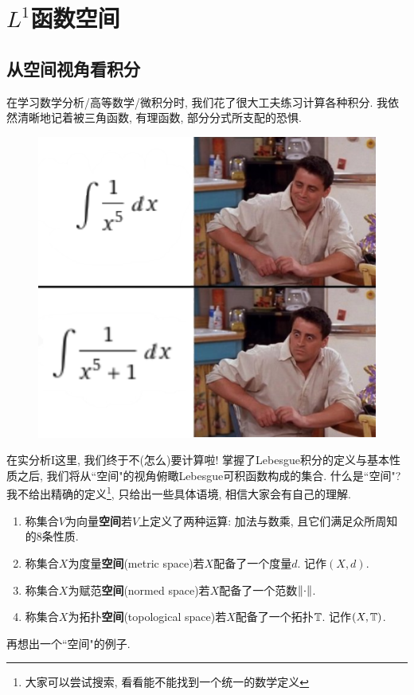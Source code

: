 \section{$L^1$函数空间}\label{L1_space}
\subsection{从空间视角看积分}
在学习数学分析/高等数学/微积分时, 我们花了很大工夫练习计算各种积分. 我依然清晰地记着被三角函数, 有理函数, 部分分式所支配的恐惧. 
\begin{figure}[h]
    \centering
    \includegraphics[scale=0.4]{image/integrate_meme.png}
\end{figure}
在实分析I这里, 我们终于不(怎么)要计算啦! 掌握了Lebesgue积分的定义与基本性质之后, 我们将从``空间"的视角俯瞰Lebesgue可积函数构成的集合. 
什么是``空间"? 我不给出精确的定义\footnote{大家可以尝试搜索, 看看能不能找到一个统一的数学定义}, 
只给出一些具体语境, 相信大家会有自己的理解.
\begin{enumerate}
    \item 称集合$V$为向量\textbf{空间}若$V$上定义了两种运算: 加法与数乘, 且它们满足众所周知的8条性质. 
    \item 称集合$X$为度量\textbf{空间}(metric space)若$X$配备了一个度量$d$. 记作$(X, d)$.
    \item 称集合$X$为赋范\textbf{空间}(normed space)若$X$配备了一个范数$\norm{\cdot}$.
    \item 称集合$X$为拓扑\textbf{空间}(topological space)若$X$配备了一个拓扑$\mathbb{T}$. 记作$(X, \mathbb{T})$.
\end{enumerate}
\begin{exercise}
    再想出一个``空间"的例子.
\end{exercise}

